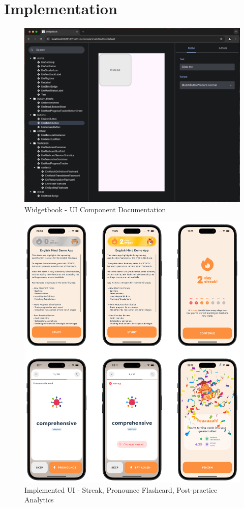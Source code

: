 \chapter{Implementation}
\label{app:implementation}

\begin{figure}[!h]
    \includegraphics[width=1.0\textwidth]{src/figures/widgetbook.png}
    \caption{Widgetbook - UI Component Documentation}
    \label{fig:widgetbook}
\end{figure}

\begin{figure}[!h]
    \includegraphics[width=1.0\textwidth]{src/figures/implementation-1.png}
    \caption{Implemented UI - Streak, Pronounce Flashcard, Post-practice Analytics}
    \label{fig:implementation-1}
\end{figure}

